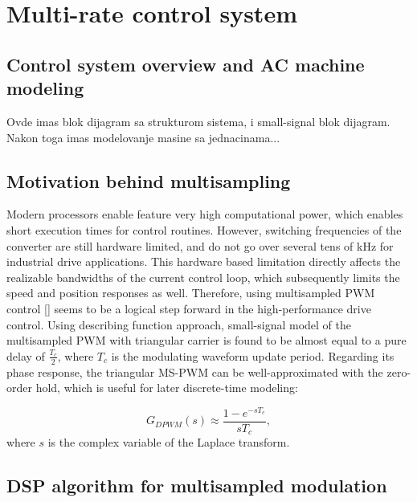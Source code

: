 \documentclass[journal]{IEEEtran}
\begin{document}
\section{Multi-rate control system}
\subsection{Control system overview and AC machine modeling}
Ovde imas blok dijagram sa strukturom sistema, i small-signal blok dijagram. Nakon toga imas modelovanje masine sa jednacinama...


\subsection{Motivation behind multisampling}
Modern processors enable feature very high computational power, which enables short execution times for control routines. However, switching frequencies of the converter are still hardware limited, and do not go over several tens of kHz for industrial drive applications. This hardware based limitation directly affects the realizable bandwidths of the current control loop, which subsequently limits the speed and position responses as well. Therefore, using multisampled PWM control [] seems to be a logical step forward in the high-performance drive control. 
Using describing function approach, small-signal model of the multisampled PWM with triangular carrier is found to be almost equal to a pure delay of $\frac{T_c}{2}$, where $T_c$ is the modulating waveform update period. Regarding its phase response, the triangular MS-PWM can be well-approximated with the zero-order hold, which is useful for later discrete-time modeling: 

\begin{equation}
G_{DPWM}(s) \approx \frac{1-e^{-sT_c}}{sT_c}, 
\label{eq:DPWM_model}  
\end{equation}
where $s$ is the complex variable of the Laplace transform.

\subsection{DSP algorithm for multisampled modulation}
\end{document}
